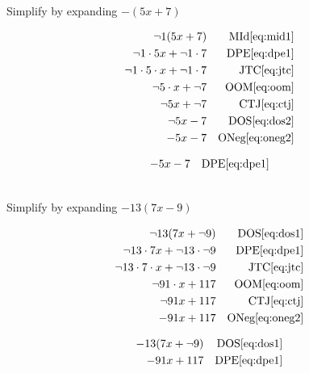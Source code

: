 \documentclass[20150903-160354-rs2.2-MarksMathNotebook.tex]{subfiles}
\begin{document}
\begin{example}[id:20141109-092448] \label{20141109-092448}  \hfill \\

Simplify by expanding $-(5x+7)$

\soln

\solnsteps
\begin{align*}
\neg 1(5x+7) && \text{MId} \eqref{eq:mid1} \\
\neg 1 \cdot 5x + \neg 1 \cdot 7  && \text{DPE} \eqref{eq:dpe1} \\
\neg 1 \cdot 5 \cdot x + \neg 1 \cdot 7  && \text{JTC} \eqref{eq:jtc} \\
\neg 5 \cdot x + \neg 7 && \text{OOM} \eqref{eq:oom} \\
\neg 5 x + \neg 7  && \text{CTJ} \eqref{eq:ctj} \\
\neg 5x - 7  && \text{DOS} \eqref{eq:dos2} \\
-5x-7  && \text{ONeg} \eqref{eq:oneg2}
\end{align*}

\soln

\lesssteps
\begin{align*}
-5x-7 && \text{DPE} \eqref{eq:dpe1}
\end{align*}

\end{example}

\begin{example}[id:20141109-092651] \label{20141109-092651}  \hfill \\

Simplify by expanding $- 13(7x-9)$

\soln

\solnsteps
\begin{align*}
\neg 13 (7x+\neg 9)  && \text{DOS} \eqref{eq:dos1} \\
\neg 13 \cdot 7x + \neg 13 \cdot \neg 9 && \text{DPE} \eqref{eq:dpe1} \\
\neg 13 \cdot 7 \cdot x + \neg 13 \cdot \neg 9  && \text{JTC} \eqref{eq:jtc} \\
\neg 91 \cdot x + 117  && \text{OOM} \eqref{eq:oom} \\
\neg 91 x + 117  && \text{CTJ} \eqref{eq:ctj} \\
-91x + 117 && \text{ONeg} \eqref{eq:oneg2}
\end{align*}

\soln

\lesssteps
\begin{align*}
-13(7x+ \neg 9) && \text{DOS} \eqref{eq:dos1} \\
- 91 x + 117 && \text{DPE} \eqref{eq:dpe1}
\end{align*}

\end{example}
\end{document}
